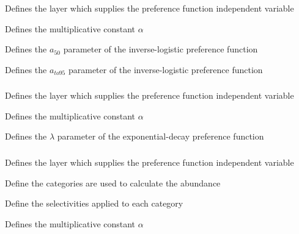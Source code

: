  {Defines the layer which supplies the preference function independent variable}

 {Defines the multiplicative constant $\alpha$}

 {Defines the $a_{50}$ parameter of the inverse-logistic preference function}

 {Defines the $a_{to95}$ parameter of the inverse-logistic preference function}

\subsubsection[Exponential-decay]{}

 {Defines the layer which supplies the preference function independent variable}

 {Defines the multiplicative constant $\alpha$}

 {Defines the $\lambda$ parameter of the exponential-decay preference function}

\subsubsection[Threshold]{}

 {Defines the layer which supplies the preference function independent variable}

 {Define the categories are used to calculate the abundance}

 {Define the selectivities applied to each category}

 {Defines the multiplicative constant $\alpha$}

